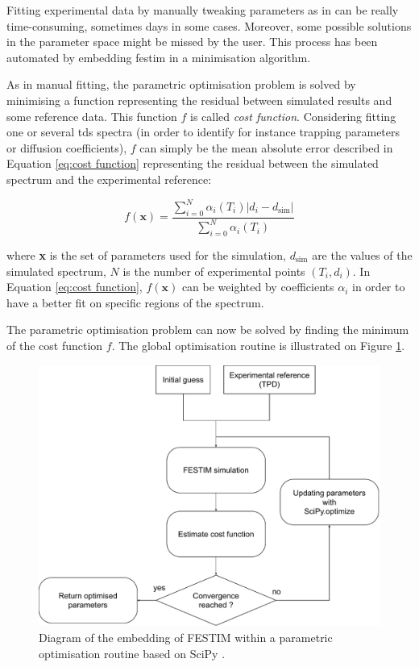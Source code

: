 Fitting experimental data by manually tweaking parameters as in  can be really time-consuming, sometimes days in some cases.
Moreover, some possible solutions in the parameter space might be missed by the user.
This process has been automated by embedding \gls{festim} in a minimisation algorithm.

As in manual fitting, the parametric optimisation problem is solved by minimising a function representing the residual between simulated results and some reference data.
This function $f$ is called \textit{cost function}.
Considering fitting one or several \gls{tds} spectra (in order to identify for instance trapping parameters or diffusion coefficients), $f$ can simply be the mean absolute error described in Equation \ref{eq:cost function} representing the residual between the simulated spectrum and the experimental reference: 

\begin{equation}
    f(\textbf{x})=\frac{\sum_{i=0}^{N}  \alpha_i(T_i)\left| d_{i}-d_{\mathrm{sim}}\right|}{\sum_{i=0}^{N}  \alpha_i(T_i)}
    \label{eq:cost function}
\end{equation}

where \textbf{x} is the set of parameters used for the simulation, $d_\mathrm{sim}$ are the values of the simulated spectrum, $N$ is the number of experimental points $(T_i, d_i)$.
In Equation \ref{eq:cost function}, $f(\textbf{x})$ can be weighted by coefficients $\alpha_i$ in order to have a better fit on specific regions of the spectrum.

The parametric optimisation problem can now be solved by finding the minimum of the cost function $f$.
The global optimisation routine is illustrated on Figure \ref{fig:diagramm}.
\begin{figure}
    \centering
    \includegraphics[width=\linewidth]{Figures/Chapter3/Parametric_optimisation/algorithm diagram.pdf}
    \caption{Diagram of the embedding of FESTIM within a parametric optimisation routine based on SciPy \cite{virtanen_scipy_2020}.}
    \label{fig:diagramm}
\end{figure}

